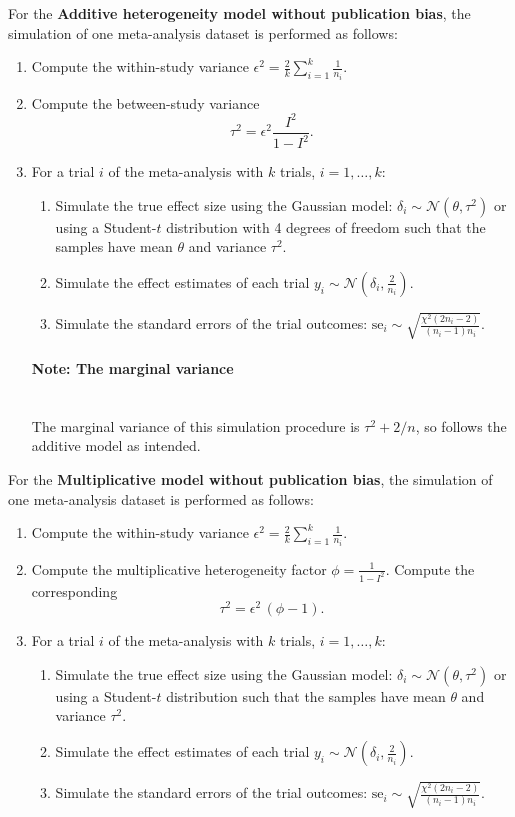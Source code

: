 \documentclass[letterpaper, 12pt]{article}
\newcommand{\N}{\mathcal{N}}
\begin{document}
For the \textbf{Additive heterogeneity model without publication bias}, the simulation of one meta-analysis dataset is performed as follows:
\begin{enumerate}
\item Compute the within-study variance $\epsilon^2 = \frac{2}{k} \sum\limits_{i=1}^k \frac{1}{n_i}$.
\item Compute the between-study variance
  \begin{equation}\label{eq:eq1}
    \tau^2 = \epsilon^2 \frac{I^2}{1-I^2}.
\end{equation}
\item For a trial $i$ of the meta-analysis with $k$ trials, $i = 1, \dots, k$:
  \begin{enumerate}
  \item Simulate the true effect size using the Gaussian model: $\delta_i \sim \N(\theta, \tau^2)$ or using a Student-$t$ distribution with 4 degrees of freedom such that the samples have mean $\theta$ and variance $\tau^2$.
  \item Simulate the effect estimates of each trial $y_i \sim \N(\delta_i, \frac{2}{n_i})$.
  \item Simulate the standard errors of the trial outcomes: $\text{se}_i \sim \sqrt{\frac{\chi^2(2n_i-2)}{(n_i-1)n_i}}$.
  \end{enumerate}

\paragraph{Note: The marginal variance}\mbox{}\\
The marginal variance of this simulation procedure is
$\tau^2 + 2/n$, so follows the additive model as intended.
\end{enumerate}
For the \textbf{Multiplicative model without publication bias}, the simulation of one meta-analysis dataset is performed as follows:
\begin{enumerate}
\item Compute the within-study variance $\epsilon^2 = \frac{2}{k} \sum\limits_{i=1}^k \frac{1}{n_i}$.
  \item Compute the multiplicative heterogeneity factor $\phi = \frac{1}{1-I^2}$. Compute the corresponding
  \begin{equation}\label{eq:eq2}
    \tau^2 = \epsilon^2 \, (\phi-1) .
  \end{equation}
\item For a trial $i$ of the meta-analysis with $k$ trials, $i = 1, \dots, k$:
  \begin{enumerate}
  \item Simulate the true effect size using the Gaussian model: $\delta_i \sim \N(\theta, \tau^2)$ or using a Student-$t$ distribution such that the samples have mean $\theta$ and variance $\tau^2$.
  \item Simulate the effect estimates of each trial $y_i \sim \N(\delta_i, \frac{2}{n_i})$.
  \item Simulate the standard errors of the trial outcomes: $\text{se}_i \sim \sqrt{\frac{\chi^2(2n_i-2)}{(n_i-1)n_i}}$.
  \end{enumerate}
  \end{enumerate}
\end{document}

